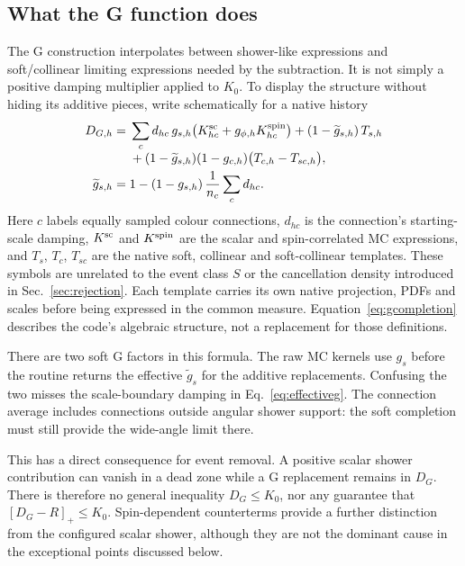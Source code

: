 \documentclass[11pt,a4paper]{article}
\newcommand{\pos}[1]{\left[#1\right]_+}
\begin{document}
\subsection{What the G function does}
\label{sec:g}
The G construction interpolates between shower-like expressions and
soft/collinear limiting expressions needed by the subtraction. It is
not simply a positive damping multiplier applied to $K_0$. To display
the structure without hiding its additive pieces, write schematically
for a native history
\begin{align}
 D_{G,h}={}&\sum_c d_{hc}\,g_{s,h}
       \bigl(K^{\rm sc}_{hc}+g_{\phi,h}K^{\rm spin}_{hc}\bigr)
       +(1-\widetilde g_{s,h})\,T_{s,h}
       \nonumber\\[-1mm]
 &+(1-\widetilde g_{s,h})(1-g_{c,h})
       \bigl(T_{c,h}-T_{sc,h}\bigr),
 \label{eq:gcompletion}\\
 \widetilde g_{s,h}={}&1-(1-g_{s,h})\,
                 \frac{1}{n_c}\sum_c d_{hc}.
 \label{eq:effectiveg}
\end{align}
Here $c$ labels equally sampled colour connections, $d_{hc}$ is the
connection's starting-scale damping, $K^{\rm sc}$ and $K^{\rm spin}$ are
the scalar and spin-correlated MC expressions, and
$T_s$, $T_c$, $T_{sc}$ are the native soft,
collinear and soft-collinear templates. These symbols are
unrelated to the event class $S$ or the cancellation density introduced
in Sec.~\ref{sec:rejection}. Each template carries its own native
projection, PDFs and scales before being expressed in the common
measure. Equation~\eqref{eq:gcompletion} describes the code's algebraic
structure, not a replacement for those definitions.

There are two soft G factors in this formula. The raw MC kernels use
$g_s$ before the routine returns the effective $\widetilde g_s$ for
the additive replacements. Confusing the two misses the scale-boundary
damping in Eq.~\eqref{eq:effectiveg}. The connection average includes
connections outside angular shower support: the soft completion must
still provide the wide-angle limit there.

This has a direct consequence for event removal. A positive scalar
shower contribution can vanish in a dead zone while a G replacement
remains in $D_G$. There is therefore no general inequality
$D_G\le K_0$, nor any guarantee that $\pos{D_G-R}\le K_0$.
Spin-dependent counterterms provide a further distinction from the
configured scalar shower, although they are not the dominant cause in
the exceptional points discussed below.
\end{document}
